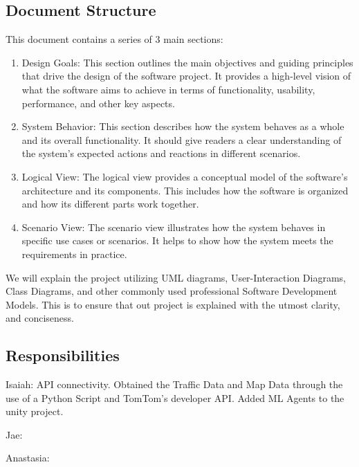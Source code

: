 \subsection{Document Structure}

This document contains a series of 3 main sections:
\begin{enumerate}
    \item Design Goals: This section outlines the main objectives and guiding principles that drive the design of the software project. 
    It provides a high-level vision of what the software aims to achieve in terms of functionality, usability, performance, and other key aspects.
    
    \item System Behavior: This section describes how the system behaves as a whole and its overall functionality. 
    It should give readers a clear understanding of the system's expected actions and reactions in different scenarios.
    
    \item Logical View: The logical view provides a conceptual model of the software's architecture and its components. 
    This includes how the software is organized and how its different parts work together.

    \item Scenario View: The scenario view illustrates how the system behaves in specific use cases or scenarios. 
    It helps to show how the system meets the requirements in practice.
\end{enumerate}

We will explain the project utilizing UML diagrams, User-Interaction Diagrams, Class Diagrams, and other commonly used professional Software Development Models.
This is to ensure that out project is explained with the utmost clarity, and conciseness.

\subsection{Responsibilities}

Isaiah: API connectivity.
Obtained the Traffic Data and Map Data through the use of a Python Script and TomTom's developer API.
Added ML Agents to the unity project.

Jae: 

Anastasia: 